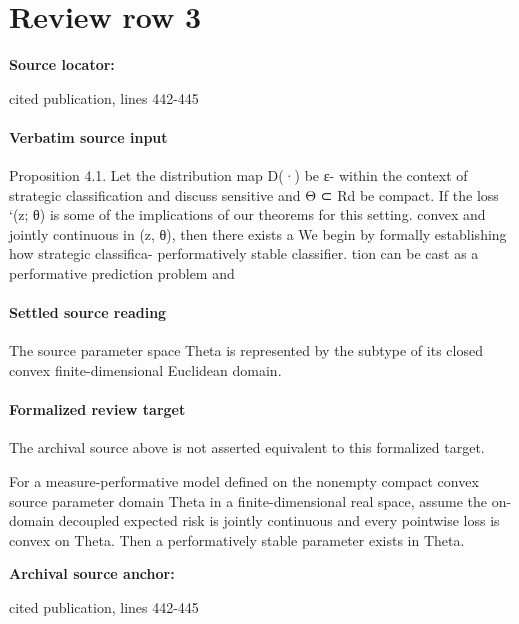 \documentclass[10pt]{article}
\begin{document}
\section*{Review row 3}
\textbf{Source locator:} {\footnotesize\raggedright cited publication, lines 442-\allowbreak{}445\par}
\paragraph{Verbatim source input}
\begin{ReviewVerbatim}
Proposition 4.1. Let the distribution map D(·) be ε-                  within the context of strategic classiﬁcation and discuss
sensitive and Θ ⊂ Rd be compact. If the loss `(z; θ) is               some of the implications of our theorems for this setting.
convex and jointly continuous in (z, θ), then there exists a          We begin by formally establishing how strategic classiﬁca-
performatively stable classiﬁer.                                      tion can be cast as a performative prediction problem and
\end{ReviewVerbatim}

\paragraph{Settled source reading}
\begin{sloppypar}
The source parameter space Theta is represented by the subtype of its closed convex finite-\allowbreak{}dimensional Euclidean domain.\allowbreak{}
\end{sloppypar}
\paragraph{Formalized review target}
The archival source above is not asserted equivalent to this formalized target.
\begin{ReviewVerbatim}
For a measure-performative model defined on the nonempty compact convex source parameter domain Theta in a finite-dimensional real space, assume the on-domain decoupled expected risk is jointly continuous and every pointwise loss is convex on Theta. Then a performatively stable parameter exists in Theta.
\end{ReviewVerbatim}

\textbf{Archival source anchor:} {\footnotesize\raggedright cited publication, lines 442-\allowbreak{}445\par}
\end{document}
